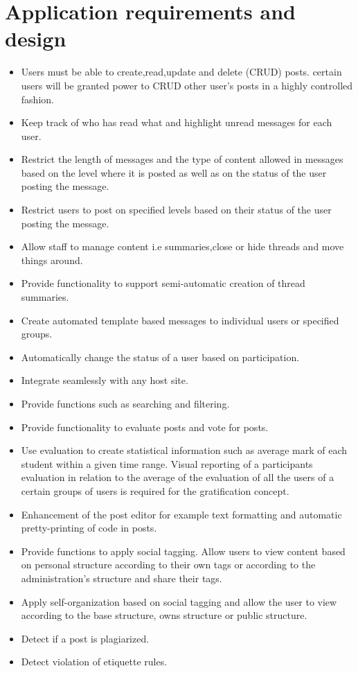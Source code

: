\documentclass[12pt]{article}
\begin{document}
\section{Application requirements and design}
\begin{itemize}
\item Users must be able to create,read,update and delete (CRUD) posts. certain users will be granted power to CRUD other user's posts in a highly controlled fashion.
\item Keep track of who has read what and highlight unread messages for each user.
\item Restrict the length of messages and the type of content allowed in messages based on the level where it is posted as well as on the status of the user posting the message.
\item Restrict users to post on specified levels based on their status of the user posting the message.
\item Allow staff to manage content i.e summaries,close or hide threads and move things around.
\item Provide functionality to support semi-automatic creation of thread summaries.
\item Create automated template based messages to individual users or specified groups.
\item Automatically change the status of a user based on participation.
\item Integrate seamlessly with any host site.
\item Provide functions such as searching and filtering.
\item Provide functionality to evaluate posts and vote for posts.
\item Use evaluation to create statistical information such as average mark of each student within a given time range. Visual reporting of a participants evaluation in relation to the average of the evaluation of all the users of a certain groups of users is required for the gratification concept.
\item Enhancement of the post editor for example text formatting and automatic pretty-printing of code in posts.
\item Provide functions to apply social tagging. Allow users to view content based on personal structure according to their own tags or according to the administration's  structure and share their tags.
\item Apply self-organization based on social tagging and allow the user to  view according to the base structure, owns structure or public structure.
\item Detect if a post is plagiarized.
\item Detect violation of etiquette rules.
\end{itemize}
\end{document}
